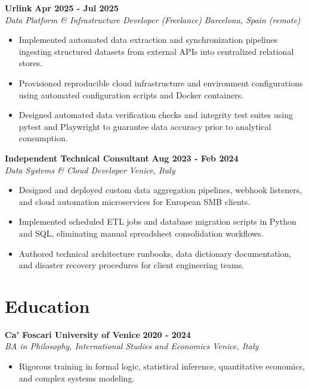 \documentclass[10pt,a4paper]{article}
\newcommand{\role}[4]{%
  \textbf{#1} \hfill \textbf{#2}\\[1pt]%
  \textit{#3} \hfill \textit{#4}\\[2pt]%
}
\begin{document}
\role{Urlink}{Apr 2025 - Jul 2025}{Data Platform \& Infrastructure Developer (Freelance)}{Barcelona, Spain (remote)}
\begin{itemize}
  \item Implemented automated data extraction and synchronization pipelines ingesting structured datasets from external APIs into centralized relational stores.
  \item Provisioned reproducible cloud infrastructure and environment configurations using automated configuration scripts and Docker containers.
  \item Designed automated data verification checks and integrity test suites using pytest and Playwright to guarantee data accuracy prior to analytical consumption.
\end{itemize}

\role{Independent Technical Consultant}{Aug 2023 - Feb 2024}{Data Systems \& Cloud Developer}{Venice, Italy}
\begin{itemize}
  \item Designed and deployed custom data aggregation pipelines, webhook listeners, and cloud automation microservices for European SMB clients.
  \item Implemented scheduled ETL jobs and database migration scripts in Python and SQL, eliminating manual spreadsheet consolidation workflows.
  \item Authored technical architecture runbooks, data dictionary documentation, and disaster recovery procedures for client engineering teams.
\end{itemize}

\section{Education}
\role{Ca' Foscari University of Venice}{2020 - 2024}{BA in Philosophy, International Studies and Economics}{Venice, Italy}
\begin{itemize}
  \item Rigorous training in formal logic, statistical inference, quantitative economics, and complex systems modeling.
\end{itemize}
\end{document}
